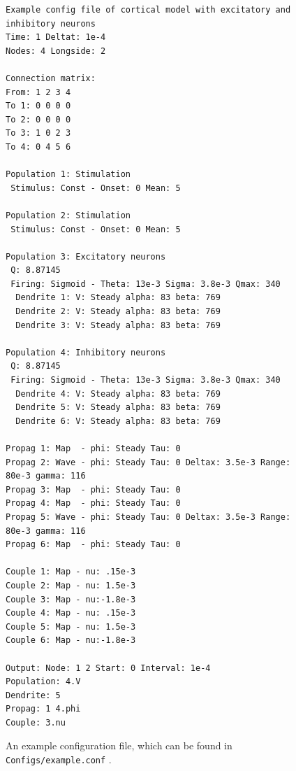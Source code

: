 \documentclass[12pt,a4paper]{article}
\newcommand{\type}[1]{ {\small\small\tt #1} }
\begin{document}
\begin{figure}\begin{center}
	\begin{lstlisting}
Example config file of cortical model with excitatory and inhibitory neurons
Time: 1 Deltat: 1e-4
Nodes: 4 Longside: 2

Connection matrix:
From: 1 2 3 4
To 1: 0 0 0 0
To 2: 0 0 0 0
To 3: 1 0 2 3
To 4: 0 4 5 6

Population 1: Stimulation
 Stimulus: Const - Onset: 0 Mean: 5

Population 2: Stimulation
 Stimulus: Const - Onset: 0 Mean: 5

Population 3: Excitatory neurons
 Q: 8.87145
 Firing: Sigmoid - Theta: 13e-3 Sigma: 3.8e-3 Qmax: 340
  Dendrite 1: V: Steady alpha: 83 beta: 769
  Dendrite 2: V: Steady alpha: 83 beta: 769
  Dendrite 3: V: Steady alpha: 83 beta: 769

Population 4: Inhibitory neurons
 Q: 8.87145
 Firing: Sigmoid - Theta: 13e-3 Sigma: 3.8e-3 Qmax: 340
  Dendrite 4: V: Steady alpha: 83 beta: 769
  Dendrite 5: V: Steady alpha: 83 beta: 769
  Dendrite 6: V: Steady alpha: 83 beta: 769

Propag 1: Map  - phi: Steady Tau: 0
Propag 2: Wave - phi: Steady Tau: 0 Deltax: 3.5e-3 Range: 80e-3 gamma: 116
Propag 3: Map  - phi: Steady Tau: 0
Propag 4: Map  - phi: Steady Tau: 0
Propag 5: Wave - phi: Steady Tau: 0 Deltax: 3.5e-3 Range: 80e-3 gamma: 116
Propag 6: Map  - phi: Steady Tau: 0

Couple 1: Map - nu: .15e-3
Couple 2: Map - nu: 1.5e-3
Couple 3: Map - nu:-1.8e-3
Couple 4: Map - nu: .15e-3
Couple 5: Map - nu: 1.5e-3
Couple 6: Map - nu:-1.8e-3

Output: Node: 1 2 Start: 0 Interval: 1e-4
Population: 4.V
Dendrite: 5
Propag: 1 4.phi
Couple: 3.nu
	\end{lstlisting}
\end{center}
\caption{An example configuration file, which can be found in \type{Configs/example.conf}.}
\end{figure}
\end{document}
